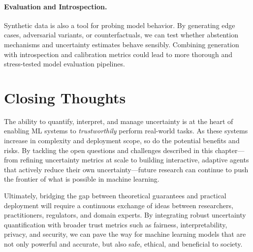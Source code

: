\paragraph{Evaluation and Introspection.} Synthetic data is also a tool for probing model behavior. By generating edge cases, adversarial variants, or counterfactuals, we can test whether abstention mechanisms and uncertainty estimates behave sensibly. Combining generation with introspection and calibration metrics could lead to more thorough and stress-tested model evaluation pipelines.

\section{Closing Thoughts}

The ability to quantify, interpret, and manage uncertainty is at the heart of enabling ML systems to \emph{trustworthily} perform real-world tasks. As these systems increase in complexity and deployment scope, so do the potential benefits and risks. By tackling the open questions and challenges described in this chapter—from refining uncertainty metrics at scale to building interactive, adaptive agents that actively reduce their own uncertainty—future research can continue to push the frontier of what is possible in machine learning.

Ultimately, bridging the gap between theoretical guarantees and practical deployment will require a continuous exchange of ideas between researchers, practitioners, regulators, and domain experts. By integrating robust uncertainty quantification with broader trust metrics such as fairness, interpretability, privacy, and security, we can pave the way for machine learning models that are not only powerful and accurate, but also safe, ethical, and beneficial to society.

